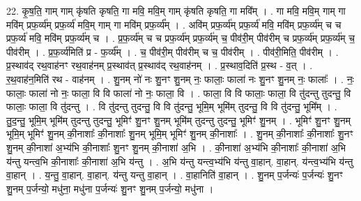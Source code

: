 \documentclass[17pt]{extarticle}
\begin{document}
22. कृ॒ष॒ति॒ गाम् गाम् कृ॑षति कृषति॒ गा मवि॒ मवि॒म् गाम् कृ॑षति कृषति॒ गा मवि᳚म् । . गा मवि॒ मवि॒म् गाम् गा मवि॑म् प्रफ॒र्व्य॑म् प्रफ॒र्व्य॑ मवि॒म् गाम् गा मवि॑म् प्रफ॒र्व्य᳚म् । . अवि॑म् प्रफ॒र्व्य॑म् प्रफ॒र्व्य॑ मवि॒ मवि॑म् प्रफ॒र्व्य॑म् च च प्रफ॒र्व्य॑ मवि॒ मवि॑म् प्रफ॒र्व्य॑म् च । . प्र॒फ॒र्व्य॑म् च च प्रफ॒र्व्य॑म् प्रफ॒र्व्य॑म् च॒ पीव॑री॒म् पीव॑रीम् च प्रफ॒र्व्य॑म् प्रफ॒र्व्य॑म् च॒ पीव॑रीम् । . प्र॒फ॒र्व्य॑मिति॑ प्र - फ॒र्व्य᳚म् । . च॒ पीव॑री॒म् पीव॑रीम् च च॒ पीव॑रीम् । . पीव॑री॒मिति॒ पीव॑रीम् । . प्र॒स्थाव॑द् रथ॒वाह॑नꣳ रथ॒वाह॑नम् प्र॒स्थाव॑त् प्र॒स्थाव॑द् रथ॒वाह॑नम् । . प्र॒स्थाव॒दिति॑ प्र॒स्थ - व॒त् । . र॒थ॒वाह॑न॒मिति॑ रथ - वाह॑नम् । . शु॒नम् नो॑ नः शु॒नꣳ शु॒नम् नः॒ फालाः॒ फाला॑ नः शु॒नꣳ शु॒नम् नः॒ फालाः᳚ । . नः॒ फालाः॒ फाला॑ नो नः॒ फाला॒ वि वि फाला॑ नो नः॒ फाला॒ वि । . फाला॒ वि वि फालाः॒ फाला॒ वि तु॑दन्तु तुदन्तु॒ वि फालाः॒ फाला॒ वि तु॑दन्तु । . वि तु॑दन्तु तुदन्तु॒ वि वि तु॑दन्तु॒ भूमि॒म् भूमि॑म् तुदन्तु॒ वि वि तु॑दन्तु॒ भूमि᳚म् । . तु॒द॒न्तु॒ भूमि॒म् भूमि॑म् तुदन्तु तुदन्तु॒ भूमिꣳ॑ शु॒नꣳ शु॒नम् भूमि॑म् तुदन्तु तुदन्तु॒ भूमिꣳ॑ शु॒नम् । . भूमिꣳ॑ शु॒नꣳ शु॒नम् भूमि॒म् भूमिꣳ॑ शु॒नम् की॒नाशाः᳚ की॒नाशाः᳚ शु॒नम् भूमि॒म् भूमिꣳ॑ शु॒नम् की॒नाशाः᳚ । . शु॒नम् की॒नाशाः᳚ की॒नाशाः᳚ शु॒नꣳ शु॒नम् की॒नाशा॑ अ॒भ्य॑भि की॒नाशाः᳚ शु॒नꣳ शु॒नम् की॒नाशा॑ अ॒भि । . की॒नाशा॑ अ॒भ्य॑भि की॒नाशाः᳚ की॒नाशा॑ अ॒भि य॑न्तु यन्त्व॒भि की॒नाशाः᳚ की॒नाशा॑ अ॒भि य॑न्तु । . अ॒भि य॑न्तु यन्त्व॒भ्य॑भि य॑न्तु वा॒हान्. वा॒हान्. य॑न्त्व॒भ्य॑भि य॑न्तु वा॒हान् । . य॒न्तु॒ वा॒हान्. वा॒हान्. य॑न्तु यन्तु वा॒हान् । . वा॒हानिति॑ वा॒हान् । . शु॒नम् प॒र्जन्यः॑ प॒र्जन्यः॑ शु॒नꣳ शु॒नम् प॒र्जन्यो॒ मधु॑ना॒ मधु॑ना प॒र्जन्यः॑ शु॒नꣳ शु॒नम् प॒र्जन्यो॒ मधु॑ना । \newline
\end{document}
